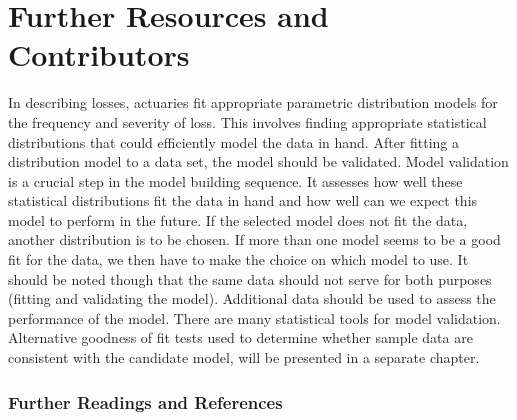 \documentclass[]{book}
\begin{document}
\section{Further Resources and
Contributors}\label{Resources-loss-severity}

In describing losses, actuaries fit appropriate parametric distribution
models for the frequency and severity of loss. This involves finding
appropriate statistical distributions that could efficiently model the
data in hand. After fitting a distribution model to a data set, the
model should be validated. Model validation is a crucial step in the
model building sequence. It assesses how well these statistical
distributions fit the data in hand and how well can we expect this model
to perform in the future. If the selected model does not fit the data,
another distribution is to be chosen. If more than one model seems to be
a good fit for the data, we then have to make the choice on which model
to use. It should be noted though that the same data should not serve
for both purposes (fitting and validating the model). Additional data
should be used to assess the performance of the model. There are many
statistical tools for model validation. Alternative goodness of fit
tests used to determine whether sample data are consistent with the
candidate model, will be presented in a separate chapter.

\subsubsection*{Further Readings and
References}\label{further-readings-and-references}
\end{document}
